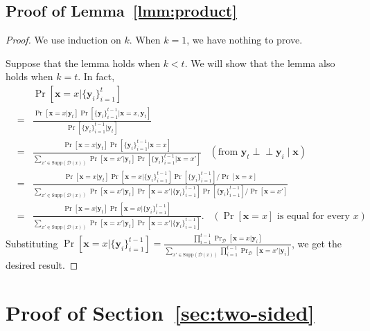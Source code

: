 \documentclass[letterpaper,11pt]{article}
\newcommand{\cald}{\mathcal{D}}
\newcommand{\bfx}{\mathbf{x}}
\newcommand{\bfy}{\mathbf{y}}
\newcommand{\ci}{\perp\!\!\!\perp}
\newcommand{\supp}{\mathrm{Supp}}
\begin{document}
\subsection{Proof of Lemma~\ref{lmm:product}}
\begin{proof}
  We use induction on $k$.
  When $k=1$, we have nothing to prove.

  Suppose that the lemma holds when $k<t$.
  We will show that the lemma also holds when $k=t$.
  In fact,
  \begin{eqnarray*}
    &&
    \Pr[\bfx=x|\{\bfy_i\}_{i=1}^t]\\
    &=&
    \frac{\Pr[\bfx=x|\bfy_t]\Pr[\{\bfy_i\}_{i=1}^{t-1}|\bfx=x,\bfy_t]}{\Pr[\{\bfy_i\}_{i=1}^{t-1}|\bfy_t]}\\
    &=&
    \frac{\Pr[\bfx=x|\bfy_t]\Pr[\{\bfy_i\}_{i=1}^{t-1}|\bfx=x]}{\sum_{x'\in \supp(\cald(x))}\Pr[\bfx=x'|\bfy_t]\Pr[\{\bfy_i\}_{i=1}^{t-1}|\bfx=x']}\;\;\;(\mbox{from }\bfy_t \ci \bfy_i \mid \bfx)\\
    &=&
    \frac{\Pr[\bfx=x|\bfy_t]\Pr[\bfx=x|\{\bfy_i\}_{i=1}^{t-1}]\Pr[\{\bfy_i\}_{i=1}^{t-1}]/\Pr[\bfx=x]}{\sum_{x'\in \supp(\cald(x))}\Pr[\bfx=x'|\bfy_t]\Pr[\bfx=x'|\{\bfy_i\}_{i=1}^{t-1}]\Pr[\{\bfy_i\}_{i=1}^{t-1}]/\Pr[\bfx=x']}\\
    &=&
    \frac{\Pr[\bfx=x|\bfy_t]\Pr[\bfx=x|\{\bfy_i\}_{i=1}^{t-1}]}{\sum_{x'\in \supp(\cald(x))}\Pr[\bfx=x'|\bfy_t]\Pr[\bfx=x'|\{\bfy_i\}_{i=1}^{t-1}]}.\;\;\;(\Pr[\bfx=x]\mbox{ is equal for every }x)
  \end{eqnarray*}
  Substituting \(\Pr[\bfx=x|\{\bfy_i\}_{i=1}^{t-1}]=\frac{\prod_{i=1}^{t-1}\Pr_{\cald}[\bfx=x|\bfy_i]}{\sum_{x'\in \supp(\cald(x))}\prod_{i=1}^{t-1}\Pr_{\cald}[\bfx=x'|\bfy_i]}\),
  we get the desired result.
\end{proof}

\section{Proof of Section~\ref{sec:two-sided}}\label{apx:proof-two-sided}
\end{document}
